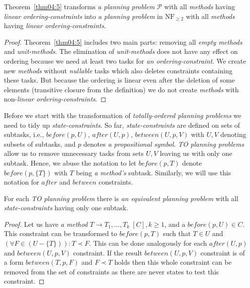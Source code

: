 \begin{example}\label{ex04:7}
\end{example}

\begin{thm}\label{thm04:7}
    Theorem~\ref{thm04:5} transforms \emph{a planning problem} $\mathcal{P}$ with all \emph{methods} having \emph{linear ordering-constraints} into \emph{a planning problem} in $\text{NF}_{\geq 2}$ with all \emph{methods} having \emph{linear ordering-constraints}.
\end{thm}
\begin{proof}
    Theorem~\ref{thm04:5} includes two main parts: removing all \emph{empty methods} and \emph{unit-methods}. The elimination of \emph{unit-methods} does not have any effect on ordering because we need at least two tasks for \emph{an ordering-constraint}. We create new \emph{methods} without \emph{nullable} tasks which also deletes constraints containing these tasks. But because the ordering is linear even after the deletion of some elements (transitive closure from the definition) we do not create \emph{methods} with non-\emph{linear ordering-constraints}.
\end{proof}

\medskip\noindent
Before we start with the transformation of \emph{totally-ordered planning problems} we need to tidy up \emph{state-constraints}. So far, \emph{state-constraints} are defined on sets of subtasks, i.e., $before(p, U)$, $after(U, p)$, $between(U, p, V)$ with $U, V$ denoting subsets of subtasks, and $p$ denotes \emph{a propositional symbol}. \emph{TO planning problems} allow us to remove unnecessary tasks from sets $U, V$ leaving us with only one subtask. Hence, we abuse the notation to let $before(p, T)$ denote $before(p, \{ T \})$ with $T$ being \emph{a method's} subtask. Similarly, we will use this notation for $after$ and $between$ constraints. 

\begin{thm}\label{thm04:8}
    For each \emph{TO planning problem} there is \emph{an equivalent planning problem} with all \emph{state-constraints} having only one subtask.
\end{thm}
\begin{proof}
    Let us have \emph{a method} $T \rightarrow T_1, \dots, T_k \; [C], k \geq 1$, and a $before(p, U) \in C$. This constraint can be transformed to $before(p, T)$ such that $T \in U$ and $(\forall F \in (U - \{ T \})): T \prec F$. This can be done analogously for each $after(U, p)$ and $between(U, p, V)$ constraint. If the result $between(U, p, V)$ constraint is of a form $between(T, p, F)$ and $F \prec T$ holds then this whole constraint can be removed from the set of constraints as there are never states to test this constraint. 
\end{proof}

